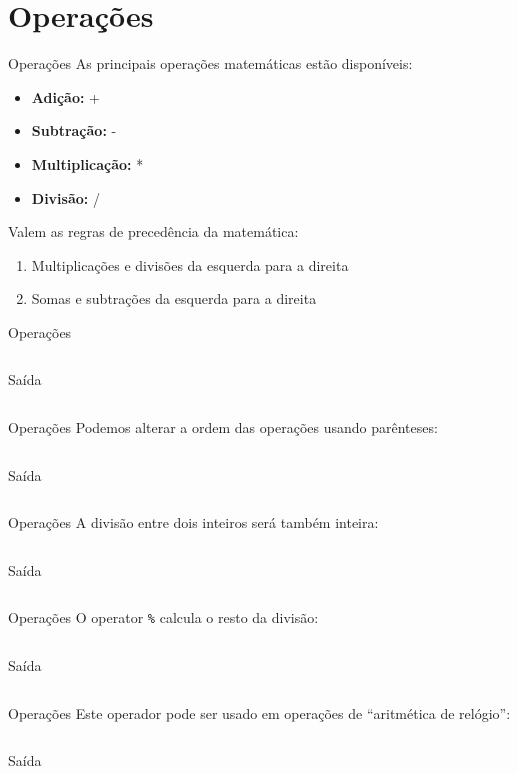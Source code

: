 \documentclass{beamer}
\begin{document}
\section{Operações}
\begin{frame}{Operações}
	As principais operações matemáticas estão disponíveis:
	\begin{itemize}
		\item \textbf{Adição:} +
		\item \textbf{Subtração:} -
		\item \textbf{Multiplicação:} *
		\item \textbf{Divisão:} /
	\end{itemize}
	Valem as regras de precedência da matemática:
	\begin{enumerate}
		\item Multiplicações e divisões da esquerda para a direita
		\item Somas e subtrações da esquerda para a direita
	\end{enumerate}
\end{frame}
\begin{frame}{Operações}
	\inputminted{c}{resources/operations.c}
	\pause
	\begin{block}{Saída}
		\inputminted{text}{resources/operationsout.txt}
	\end{block}
\end{frame}
\begin{frame}{Operações}
	Podemos alterar a ordem das operações usando parênteses:
	\inputminted{c}{resources/parenthesis.c}
	\begin{block}{Saída}
		\inputminted{text}{resources/parenthesisout.txt}
	\end{block}
\end{frame}
\begin{frame}{Operações}
	A divisão entre dois inteiros será também inteira:
	\inputminted{c}{resources/division.c}
	\begin{block}{Saída}
		\inputminted{text}{resources/divisionout.txt}
	\end{block}
\end{frame}
\begin{frame}{Operações}
	O operator \alert{\texttt{\%}} calcula o resto da divisão:
	\inputminted{c}{resources/remainder.c}
	\begin{block}{Saída}
		\inputminted{text}{resources/remainderout.txt}
	\end{block}
\end{frame}
\begin{frame}{Operações}
	Este operador pode ser usado em operações de ``aritmética de relógio'':
	\inputminted{c}{resources/clock.c}
	\begin{block}{Saída}
		\inputminted{text}{resources/clockout.txt}
	\end{block}
\end{frame}
\end{document}

